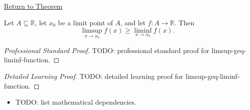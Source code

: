 \newpage
{}
\label{prf:limsup-geq-liminf-function}

\begin{remark*}[Return]
\hyperref[prop:limsup-geq-liminf-function]{Return to Theorem}
\end{remark*}

\begin{theorem*}[$$]
Let $A\subseteq \mathbb{R}$, let $x_0$ be a limit point of $A$, and let $f:A\to\mathbb{R}$. Then
\[
\limsup_{x\to x_0} f(x) \ge \liminf_{x\to x_0} f(x).
\]
\end{theorem*}

\begin{proof}[Professional Standard Proof]
\LRAProofBodyStart
TODO: professional standard proof for limsup-geq-liminf-function.
\end{proof}

\begin{proof}[Detailed Learning Proof]
\LRAProofBodyStart
TODO: detailed learning proof for limsup-geq-liminf-function.
\end{proof}

\begin{remark*}
\end{remark*}

\begin{dependencies}
\begin{itemize}
  \item TODO: list mathematical dependencies.
\end{itemize}
\end{dependencies}

\clearpage
